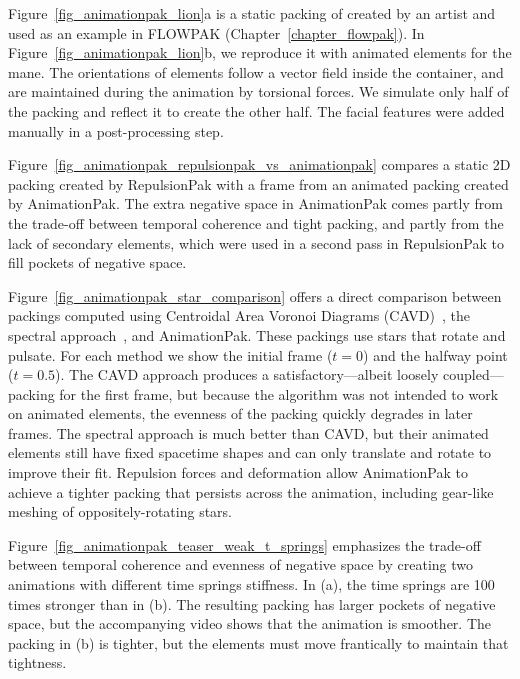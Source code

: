 Figure~\ref{fig_animationpak_lion}a is a static packing of  created by an artist and
used as an example in FLOWPAK (Chapter~\ref{chapter_flowpak}).  In Figure~\ref{fig_animationpak_lion}b,
we reproduce it with animated elements for the mane.
The orientations of elements follow a vector field inside
the container, and are maintained during the animation by 
torsional forces.
We simulate only half of the packing and reflect it to create the other half.
The facial features were added manually in a post-processing step.


Figure~\ref{fig_animationpak_repulsionpak_vs_animationpak} compares
a static 2D packing created by RepulsionPak with a frame
from an animated packing created by AnimationPak.
The extra negative space in AnimationPak comes partly from the trade-off
between temporal coherence and tight packing, and partly from the lack
of secondary elements, which were used in a second pass in RepulsionPak 
to fill pockets of negative space.


Figure~\ref{fig_animationpak_star_comparison} offers a direct comparison between
packings computed using Centroidal Area Voronoi Diagrams
(CAVD)~\cite{Smith2005}, the spectral approach~\cite{Dalal2006}, and AnimationPak.
These packings use stars that rotate and pulsate.
For each method we show the initial frame ($t=0$) and the halfway point
($t=0.5$).  The CAVD approach produces a satisfactory---albeit
loosely coupled---packing for the first frame, but because the 
algorithm was not intended to work on animated elements, 
the evenness of the packing quickly degrades in later frames.
The spectral approach is much better
than CAVD, but their animated elements still have fixed spacetime shapes
and can only translate and rotate to improve their fit. 
Repulsion forces and deformation allow AnimationPak to achieve a tighter packing
that persists across the animation, including gear-like meshing of
oppositely-rotating stars.




Figure~\ref{fig_animationpak_teaser_weak_t_springs} emphasizes the trade-off between
temporal coherence and evenness of negative space by creating two animations
with different time springs stiffness.  In (a), the time springs
are 100 times stronger than in (b).  The resulting packing has larger
pockets of negative space, but the accompanying video shows that the
animation is smoother.  The packing in (b) is tighter, but the elements
must move frantically to maintain that tightness.


